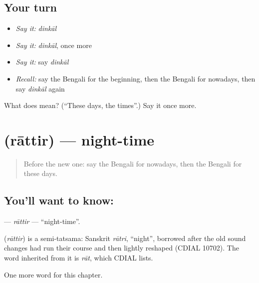 \subsection*{Your turn}
\begin{itemize}
\raggedright
  \item \emph{Say it:} \emph{dinkāl}
  \item \emph{Say it:} \emph{dinkāl}, once more
  \item \emph{Say it:} say \emph{dinkāl}
  \item \emph{Recall:} say the Bengali for the beginning, then the Bengali for nowadays, then say \emph{dinkāl} again
\end{itemize}

\begin{tcolorbox}[breakable,colback=teal!4,colframe=teal!35!black,title={Before you move on}]
What does  mean? (\textquotedblleft{}These days, the times\textquotedblright{}.) Say it once more.
\end{tcolorbox}
\section[\texorpdfstring{\bn{রাত্তির} (rāttir)}{রাত্তির (rāttir)}]{ (rāttir) — night-time}

\label{lesson:BN-C94-rattir}



\begin{quote}
Before the new one: say the Bengali for nowadays, then the Bengali for these days.
\end{quote}

\subsection*{You'll want to know: }
\textbf{} — \emph{rāttir} — \textquotedblleft{}night-time\textquotedblright{}.

\begin{cousinweb}
\textbf{} (\emph{rāttir}) is a semi-tatsama: Sanskrit \emph{rātri}, \textquotedblleft{}night\textquotedblright{}, borrowed after the old sound changes had run their course and then lightly reshaped (CDIAL 10702). The word inherited from it is \emph{rāt}, which CDIAL lists.
\end{cousinweb}

\begin{grammarlens}[title={What you've built}]
One more word for this chapter.
\end{grammarlens}

